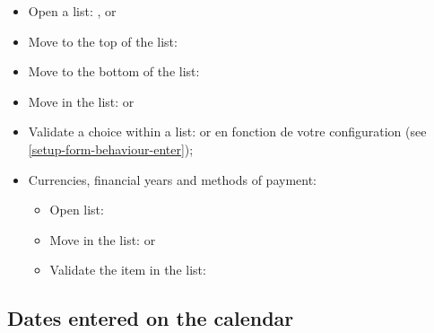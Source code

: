 \begin{itemize}
	\item Open a list: ,  or \keys{\arrowkeydown}
	\item Move to the top of the list: %
	\item Move to the bottom of the list: 
	\item Move in the list: \keys{\arrowkeyup} or \keys{\arrowkeydown}
	\item Validate a choice within a list:  or  en fonction de votre configuration (see \vref{setup-form-behaviour-enter});
	\item Currencies, financial years and methods of payment:%
	\begin{itemize}
		\item Open list: %
		\item Move in the list: \keys{\arrowkeyup} or \keys{\arrowkeydown}%
		\item Validate the item in the list: %
	\end{itemize}
\end{itemize}

\subsection{Dates entered on the calendar}%

